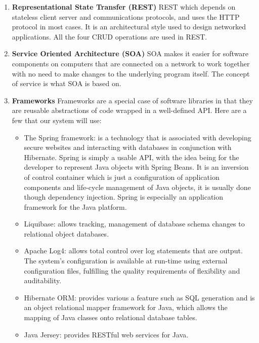 \documentclass[a4paper,10pt]{article}
\begin{document}
\begin{enumerate}

	\item \textbf{Representational State Transfer  (REST)}
	REST which depends on stateless client server and communications protocols, and uses the HTTP protocol in most cases. It is an architectural style used to design networked applications. All the four CRUD operations are used in REST. 

	\item \textbf{Service Oriented Architecture (SOA)}
	SOA makes it easier for software components on computers that are connected on a network to work together with no need to make changes to the underlying program itself. The concept of service is what SOA is based on.

	\item \textbf{Frameworks} 
	Frameworks are a special case of software libraries in that they are reusable abstractions of code wrapped in a well-defined API. Here are a few that our system will use:
	
	  \begin{itemize}
		  \item The Spring framework: is a technology that is associated with developing secure websites and interacting with databases in conjunction with Hibernate. Spring is simply a usable API, with the idea being for the developer to represent Java objects with Spring Beans.
		  It is an inversion of control container which is just a configuration of application components and life-cycle management of Java objects, it is usually done though dependency injection. Spring is especially an application framework for the Java platform. 
		  \item Liquibase: allows tracking, management of database schema changes to relational object databases.
		  \item Apache Log4: allows total control over log statements that are output. The system's configuration is available at run-time using external configuration files, fulfilling the quality requirements of flexibility and auditability.
		  \item Hibernate ORM: provides various a feature such as SQL generation and is an object relational mapper framework for Java, which allows the mapping of Java classes onto relational database tables.
		  \item Java Jersey: provides RESTful web services for Java.
	  \end{itemize}
	

\end{enumerate}
\end{document}
